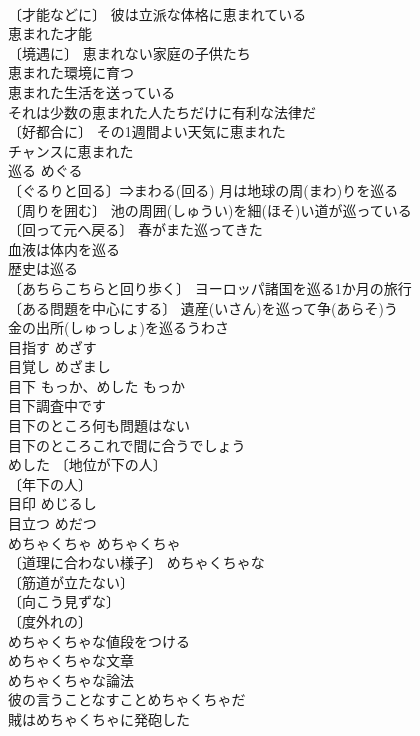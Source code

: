 \documentclass[8pt]{extreport}
\begin{document}
\begin{CJK}{UTF8}{min}
\\	〔才能などに〕 彼は立派な体格に恵まれている 
\\	恵まれた才能 
\\	〔境遇に〕 恵まれない家庭の子供たち 
\\	恵まれた環境に育つ 
\\	恵まれた生活を送っている 
\\	それは少数の恵まれた人たちだけに有利な法律だ 
\\	〔好都合に〕 その1週間よい天気に恵まれた 
\\	チャンスに恵まれた 
\\	巡る	めぐる	
\\	〔ぐるりと回る〕⇒まわる(回る) 月は地球の周(まわ)りを巡る 
\\	〔周りを囲む〕 池の周囲(しゅうい)を細(ほそ)い道が巡っている 
\\	〔回って元へ戻る〕 春がまた巡ってきた 
\\	血液は体内を巡る 
\\	歴史は巡る 
\\	〔あちらこちらと回り歩く〕 ヨーロッパ諸国を巡る1か月の旅行 
\\	〔ある問題を中心にする〕 遺産(いさん)を巡って争(あらそ)う 
\\	金の出所(しゅっしょ)を巡るうわさ 
\\	目指す	めざす	
\\	目覚し	めざまし	
\\	目下	もっか、めした	もっか 
\\	目下調査中です 
\\	目下のところ何も問題はない 
\\	目下のところこれで間に合うでしょう 
\\	めした 〔地位が下の人〕
\\	〔年下の人〕
\\	目印	めじるし	
\\	目立つ	めだつ	
\\	めちゃくちゃ	めちゃくちゃ	
\\	〔道理に合わない様子〕 めちゃくちゃな 
\\	〔筋道が立たない〕
\\	〔向こう見ずな〕
\\	〔度外れの〕
\\	めちゃくちゃな値段をつける 
\\	めちゃくちゃな文章 
\\	めちゃくちゃな論法 
\\	彼の言うことなすことめちゃくちゃだ 
\\	賊はめちゃくちゃに発砲した 

\end{CJK}
\end{document}
